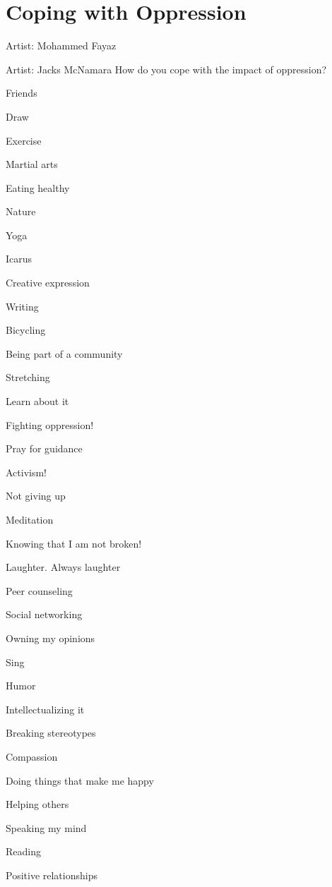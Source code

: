 \chapter{Coping with Oppression}
Artist: Mohammed Fayaz

\newpage

Artist: Jacks McNamara
How do you cope with the impact of oppression?

\begin{multicols}{2}
\begin{checkboxlist}
\item Friends
\item Draw
\item Exercise
\item Martial arts
\item Eating healthy
\item Nature
\item Yoga
\item Icarus
\item Creative expression
\item Writing
\item Bicycling
\item Being part of a community
\item Stretching
\item Learn about it
\item Fighting oppression!
\item Pray for guidance
\item Activism!
\item Not giving up
\item Meditation
\item Knowing that I am not broken!
\item Laughter. Always laughter
\item Peer counseling
\item Social networking
\item Owning my opinions
\item Sing
\item Humor
\item Intellectualizing it
\item Breaking stereotypes
\item Compassion
\item Doing things that make me happy
\item Helping others
\item Speaking my mind
\item Reading
\item Positive relationships

\end{checkboxlist}
\end{multicols}

